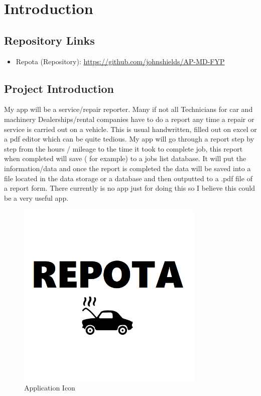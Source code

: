 \chapter{Introduction}
\section{Repository Links}
\begin{itemize}
    \item Repota (Repository): \url{https://github.com/johnshields/AP-MD-FYP}

\end{itemize}
\section{Project Introduction}
My app will be a service/repair reporter. Many if not all Technicians for car and machinery
Dealerships/rental companies have to do a report any time a repair or service is carried out on a
vehicle. This is usual handwritten, filled out on excel or a pdf editor which can be quite tedious. My
app will go through a report step by step from the hours / mileage to the time it took to complete
job, this report when completed will save ( for example) to a jobs list database. It will put the
information/data and once the report is completed the data will be saved into a file located in the
data storage or a database and then outputted to a .pdf file of a report form. There currently is no
app just for doing this so I believe this could be a very useful app.
\begin{figure}[h!]
    \caption{Application Icon} %
    \label{image:repotaChatLogo}
    \centering
    \includegraphics[width=0.8\textwidth]{images/repotaLogo.png}
\end{figure}